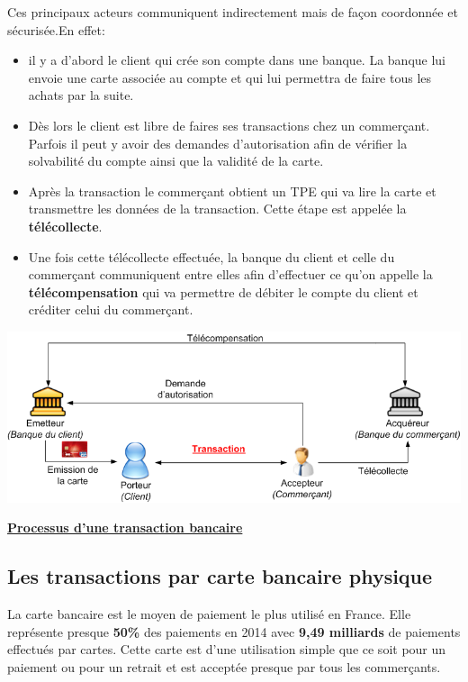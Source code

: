 \documentclass[12pt]{report}
\begin{document}
Ces principaux acteurs communiquent indirectement mais de façon coordonnée et sécurisée.En effet: 

\begin{itemize}
    \item il y a d'abord le client qui crée son compte dans une banque. La banque lui envoie une carte associée au compte et qui lui permettra de faire tous les achats par la suite.
    \item Dès lors le client est libre de faires ses transactions chez un commerçant. Parfois il peut y avoir des demandes d'autorisation afin de vérifier la solvabilité du compte ainsi que la validité de la carte.
    \item Après la transaction le commerçant obtient un TPE qui va lire la carte et transmettre les données de la transaction. Cette étape est appelée la \textbf{télécollecte}. 
    \item Une fois cette télécollecte effectuée, la banque du client et celle du commerçant communiquent entre elles afin d'effectuer ce qu'on appelle la \textbf{télécompensation} qui va permettre de débiter le compte du client et créditer celui du commerçant. \\[1cm]
\end{itemize}

\includegraphics[width=1\textwidth]{process_transaction}
\begin{center}
   \textbf{\underline{Processus d'une transaction bancaire}} \\[1cm]
\end{center}

    \subsection{Les transactions par carte bancaire physique}
\hspace{1cm} La carte bancaire est le moyen de paiement le plus utilisé en France. Elle représente presque \textbf{50\%} des paiements en 2014 avec \textbf{9,49 milliards} de paiements effectués par cartes. Cette carte est d'une utilisation simple que ce soit pour un paiement ou pour un retrait et est acceptée presque par tous les commerçants.\\
\end{document}
